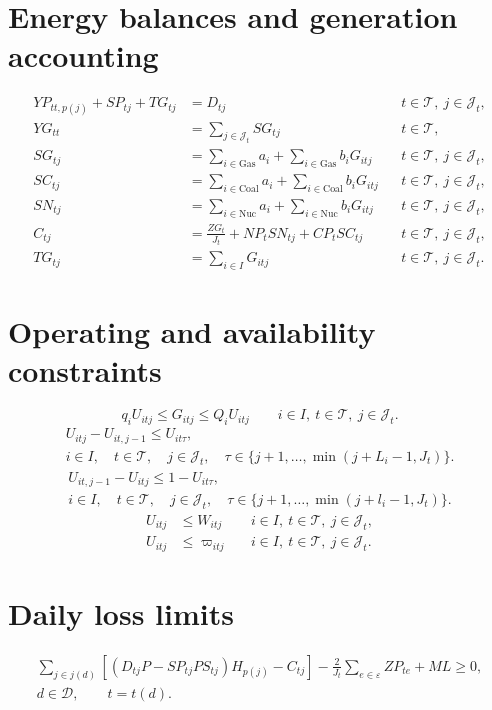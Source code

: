 \documentclass[11pt,a4paper]{article}
\begin{document}
\section*{Energy balances and generation accounting}
\begin{align}
YP_{tt,p(j)}+SP_{tj}+TG_{tj}&=D_{tj}
&&t\in\mathcal T,\ j\in\mathcal J_t,\tag{11}\\
YG_{tt}&=\sum_{j\in\mathcal J_t}SG_{tj}
&&t\in\mathcal T,\tag{12}\\
SG_{tj}&=\sum_{i\in\mathrm{Gas}}a_i
       +\sum_{i\in\mathrm{Gas}}b_iG_{itj}
&&t\in\mathcal T,\ j\in\mathcal J_t,\tag{13}\\
SC_{tj}&=\sum_{i\in\mathrm{Coal}}a_i
       +\sum_{i\in\mathrm{Coal}}b_iG_{itj}
&&t\in\mathcal T,\ j\in\mathcal J_t,\tag{14}\\
SN_{tj}&=\sum_{i\in\mathrm{Nuc}}a_i
       +\sum_{i\in\mathrm{Nuc}}b_iG_{itj}
&&t\in\mathcal T,\ j\in\mathcal J_t,\tag{15}\\
C_{tj}&=\frac{ZG_t}{J_t}+NP_tSN_{tj}+CP_tSC_{tj}
&&t\in\mathcal T,\ j\in\mathcal J_t,\tag{16}\\
TG_{tj}&=\sum_{i\in I}G_{itj}
&&t\in\mathcal T,\ j\in\mathcal J_t.\tag{17}
\end{align}

\section*{Operating and availability constraints}
\begin{equation}
q_iU_{itj}\le G_{itj}\le Q_iU_{itj}
\qquad i\in I,\ t\in\mathcal T,\ j\in\mathcal J_t.
\tag{18}
\end{equation}
\begin{equation}
\begin{gathered}
U_{itj}-U_{it,j-1}\le U_{it\tau},\\
i\in I,\quad t\in\mathcal T,\quad j\in\mathcal J_t,\quad
\tau\in\{j+1,\ldots,\min(j+L_i-1,J_t)\}.
\end{gathered}
\tag{19}
\end{equation}
\begin{equation}
\begin{gathered}
U_{it,j-1}-U_{itj}\le 1-U_{it\tau},\\
i\in I,\quad t\in\mathcal T,\quad j\in\mathcal J_t,\quad
\tau\in\{j+1,\ldots,\min(j+l_i-1,J_t)\}.
\end{gathered}
\tag{20}
\end{equation}
\begin{align}
U_{itj}&\le W_{itj}
&&i\in I,\ t\in\mathcal T,\ j\in\mathcal J_t,\tag{21}\\
U_{itj}&\le\varpi_{itj}
&&i\in I,\ t\in\mathcal T,\ j\in\mathcal J_t.\tag{22}
\end{align}

\section*{Daily loss limits}
\begin{equation}
\begin{gathered}
\sum_{j\in j(d)}
\left[(D_{tj}P-SP_{tj}PS_{tj})H_{p(j)}-C_{tj}\right]
-\frac{2}{J_t}\sum_{e\in\varepsilon}ZP_{te}+ML\ge0,\\
d\in\mathcal D,\qquad t=t(d).
\end{gathered}
\tag{23}
\end{equation}
\end{document}
